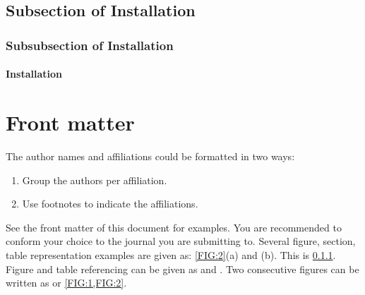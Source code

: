 \documentclass[a4paper,fleqn]{cas-dc}
\begin{document}
\subsection{Subsection of Installation}

\lipsum[2]

\subsubsection{Subsubsection of Installation}
\label{subsubsection}
\lipsum[2]

\paragraph{Installation}

\lipsum[2]

\section{Front matter}

The author names and affiliations could be formatted in two ways:
\begin{enumerate}[(1)]
\itemsep=-2pt 		%
\itemindent=12pt 	%
\item Group the authors per affiliation.
\item Use footnotes to indicate the affiliations. 

\end{enumerate}
See the front matter of this document for examples. 
You are recommended to conform your choice to the journal you 
are submitting to. 
Several figure, section, table representation examples are given as: \ref{FIG:2}(a) and (b).
This is \ref{subsubsection}. 
Figure and table referencing can be given as  and .
Two consecutive figures can be written as  or \ref{FIG:1,FIG:2}.
\end{document}
